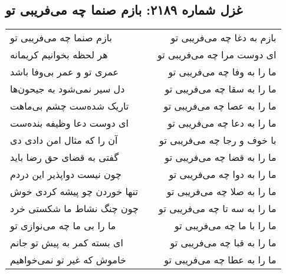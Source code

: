 \begin{center}
\section*{غزل شماره ۲۱۸۹: بازم صنما چه می‌فریبی تو}
\label{sec:2189}
\begin{longtable}{l p{0.5cm} r}
بازم صنما چه می‌فریبی تو
&&
بازم به دغا چه می‌فریبی تو
\\
هر لحظه بخوانیم کریمانه
&&
ای دوست مرا چه می‌فریبی تو
\\
عمری تو و عمر بی‌وفا باشد
&&
ما را به وفا چه می‌فریبی تو
\\
دل سیر نمی‌شود به جیحون‌ها
&&
ما را به سقا چه می‌فریبی تو
\\
تاریک شده‌ست چشم بی‌ماهت
&&
ما را به عصا چه می‌فریبی تو
\\
ای دوست دعا وظیفه بنده‌ست
&&
ما را به دعا چه می‌فریبی تو
\\
آن را که مثال امن دادی دی
&&
با خوف و رجا چه می‌فریبی تو
\\
گفتی به قضای حق رضا باید
&&
ما را به قضا چه می‌فریبی تو
\\
چون نیست دواپذیر این دردم
&&
ما را به دوا چه می‌فریبی تو
\\
تنها خوردن چو پیشه کردی خوش
&&
ما را به صلا چه می‌فریبی تو
\\
چون چنگ نشاط ما شکستی خرد
&&
ما را به سه تا چه می‌فریبی تو
\\
ما را بی ما چه می‌نوازی تو
&&
ما را با ما چه می‌فریبی تو
\\
ای بسته کمر به پیش تو جانم
&&
ما را به قبا چه می‌فریبی تو
\\
خاموش که غیر تو نمی‌خواهیم
&&
ما را به عطا چه می‌فریبی تو
\\
\end{longtable}
\end{center}
